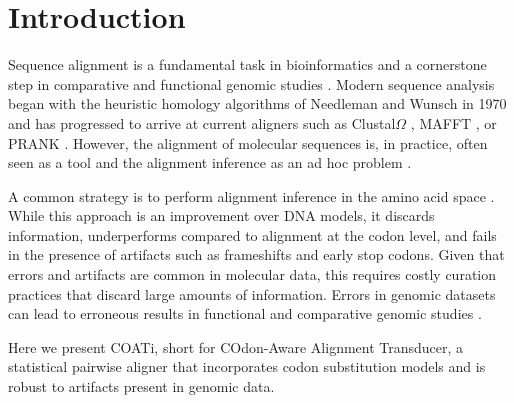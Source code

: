 \section{Introduction}

Sequence alignment is a fundamental task in bioinformatics and a cornerstone
step in comparative and functional genomic studies
\parencite{sequence_alignment_rosenberg_2009}.
Modern sequence analysis began with the heuristic homology algorithms of
Needleman and Wunsch in 1970 \parencite{identification_smith_1981} and has
progressed to arrive at current aligners such as Clustal$\Omega$
\parencite{clustal_omega_sievers_2011}, MAFFT \parencite{mafft_katoh_2002}, or
PRANK \parencite{prank_loytynoja_2014}.
However, the alignment of molecular sequences is, in practice, often seen as a
tool and the alignment inference as an ad hoc problem
\parencite{morrison_MSA_2018}.

A common strategy is to perform alignment inference in the amino acid space
\parencite{bininda2005transalign,abascal2010translatorx}.
While this approach is an improvement over DNA models, it discards information,
underperforms compared to alignment at the codon level, and fails in the
presence of artifacts such as frameshifts and early stop codons.
Given that errors and artifacts are common in molecular data, this requires
costly curation practices that discard large amounts of information.
Errors in genomic datasets can lead to erroneous results in
functional and comparative genomic studies \parencite{estimates_schneider_2009}.

Here we present COATi, short for COdon-Aware Alignment Transducer, a statistical
pairwise aligner that incorporates codon substitution models and is
robust to artifacts present in genomic data.
